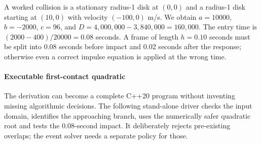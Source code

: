A worked collision is a stationary radius-1 disk at \((0,0)\) and a radius-1 disk starting at \((10,0)\) with velocity \((-100,0)\) m/s. We obtain \(a=10000\), \(b=-2000\), \(c=96\), and \(D=4{,}000{,}000-3{,}840{,}000=160{,}000\). The entry time is \((2000-400)/20000=0.08\) seconds. A frame of length \(h=0.10\) seconds must be split into 0.08 seconds before impact and 0.02 seconds after the response; otherwise even a correct impulse equation is applied at the wrong time.

\paragraph{Executable first-contact quadratic}\label{executable-first-contact-quadratic}

The derivation can become a complete C++20 program without inventing missing algorithmic decisions. The following stand-alone driver checks the input domain, identifies the approaching branch, uses the numerically safer quadratic root and tests the 0.08-second impact. It deliberately rejects pre-existing overlaps; the event solver needs a separate policy for those.

